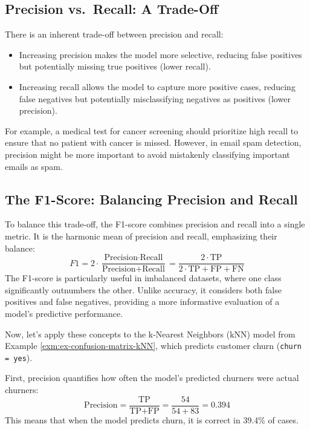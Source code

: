 \documentclass[
  11pt,
]{book}
\newcommand{\passthrough}[1]{#1}
\providecommand{\tightlist}{%
  \setlength{\itemsep}{0pt}\setlength{\parskip}{0pt}}
\theoremstyle{definition}
\theoremstyle{definition}
\theoremstyle{definition}
\theoremstyle{definition}
\theoremstyle{remark}
\begin{document}
\subsection*{Precision vs.~Recall: A Trade-Off}\label{precision-vs.-recall-a-trade-off}


There is an inherent trade-off between precision and recall:

\begin{itemize}
\tightlist
\item
  Increasing precision makes the model more selective, reducing false positives but potentially missing true positives (lower recall).\\
\item
  Increasing recall allows the model to capture more positive cases, reducing false negatives but potentially misclassifying negatives as positives (lower precision).
\end{itemize}

For example, a medical test for cancer screening should prioritize high recall to ensure that no patient with cancer is missed. However, in email spam detection, precision might be more important to avoid mistakenly classifying important emails as spam.

\subsection*{The F1-Score: Balancing Precision and Recall}\label{the-f1-score-balancing-precision-and-recall}


To balance this trade-off, the F1-score combines precision and recall into a single metric. It is the harmonic mean of precision and recall, emphasizing their balance:
\[
F1 = 2 \cdot \frac{\text{Precision} \cdot \text{Recall}}{\text{Precision} + \text{Recall}}
   = \frac{2 \cdot \text{TP}}{2 \cdot \text{TP} + \text{FP} + \text{FN}}
\]
The F1-score is particularly useful in imbalanced datasets, where one class significantly outnumbers the other. Unlike accuracy, it considers both false positives and false negatives, providing a more informative evaluation of a model's predictive performance.

Now, let's apply these concepts to the k-Nearest Neighbors (kNN) model from Example \ref{exm:ex-confusion-matrix-kNN}, which predicts customer churn (\passthrough{\lstinline!churn = yes!}).

First, precision quantifies how often the model's predicted churners were actual churners:\\
\[
\text{Precision} = \frac{\text{TP}}{\text{TP} + \text{FP}} = \frac{54}{54 + 83} = 0.394
\]
This means that when the model predicts churn, it is correct in 39.4\% of cases.
\end{document}
